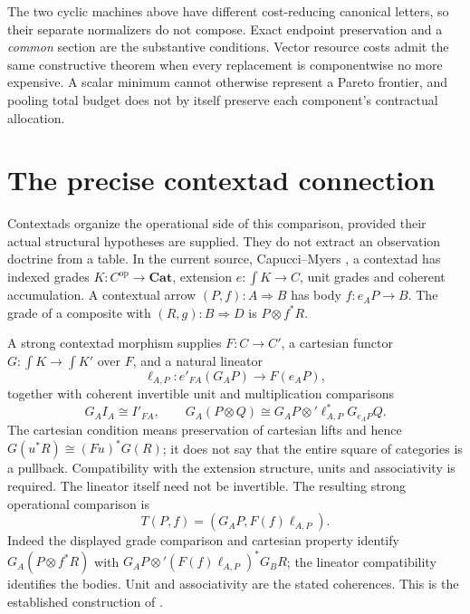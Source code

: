 \documentclass[11pt]{article}
\theoremstyle{definition}\newtheorem{definition}[theorem]{Definition}
\theoremstyle{remark}\newtheorem{remark}[theorem]{Remark}
\newcommand{\Cat}{\mathbf{Cat}}
\begin{document}
The two cyclic machines above have different cost-reducing canonical
letters, so their separate normalizers do not compose. Exact endpoint
preservation and a \emph{common} section are the substantive conditions.
Vector resource costs admit the same constructive theorem when every
replacement is componentwise no more expensive. A scalar minimum cannot
otherwise represent a Pareto frontier, and pooling total budget does not
by itself preserve each component's contractual allocation.


\section{The precise contextad connection}\label{sec:contextads}
Contextads organize the operational side of this comparison, provided their
actual structural hypotheses are supplied. They do not extract an
observation doctrine from a table. In the current source, Capucci--Myers
\cite[Definition 5.25, Examples 5.33--5.35]{CM2}, a contextad has indexed
grades $K:C^{\mathrm{op}}\to\Cat$, extension $e:\int K\to C$,
unit grades and coherent accumulation. A contextual arrow $(P,f):A\Rightarrow B$
has body $f:e_AP\to B$. The grade of a composite with $(R,g):B\Rightarrow D$
is $P\otimes f^*R$.

A strong contextad morphism supplies $F:C\to C'$, a cartesian functor
$G:\int K\to\int K'$ over $F$, and a natural lineator
\[
 \ell_{A,P}:e'_{FA}(G_AP)\longrightarrow F(e_AP),
\]
together with coherent invertible unit and multiplication comparisons
\[
 G_AI_A\cong I'_{FA},\qquad
 G_A(P\otimes Q)\cong
 G_AP\otimes'\ell_{A,P}^*G_{e_AP}Q.
\]
The cartesian condition means preservation of cartesian lifts and hence
$G(u^*R)\cong(Fu)^*G(R)$; it does not say that the entire square of
categories is a pullback. Compatibility with the extension structure,
units and associativity is required. The lineator itself need not be
invertible. The resulting strong operational comparison is
\[
 T(P,f)=(G_AP,F(f)\ell_{A,P}).
\]
Indeed the displayed grade comparison and cartesian property identify
$G_A(P\otimes f^*R)$ with
$G_AP\otimes'(F(f)\ell_{A,P})^*G_BR$; the lineator compatibility
identifies the bodies. Unit and associativity are the stated coherences.
This is the established construction of \cite[equations (5.6.20)--(5.6.21)]{CM2}.
\end{document}
